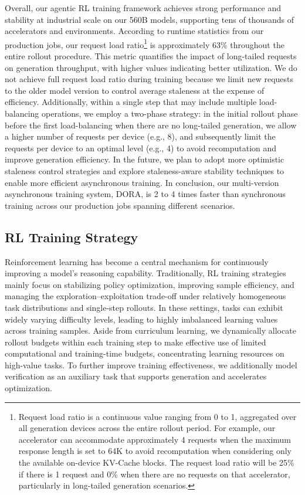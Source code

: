 \documentclass{article}
\begin{document}
Overall, our agentic RL training framework achieves strong performance and stability at industrial scale on our 560B models, supporting tens of thousands of accelerators and environments. According to runtime statistics from our production jobs, our request load ratio\footnote{Request load ratio is a continuous value ranging from 0 to 1, aggregated over all generation devices across the entire rollout period. For example, our accelerator can accommodate approximately 4 requests when the maximum response length is set to 64K to avoid recomputation when considering only the available on-device KV-Cache blocks. The request load ratio will be 25\% if there is 1 request and 0\% when there are no requests on that accelerator, particularly in long-tailed generation scenarios.} is approximately 63\% throughout the entire rollout procedure. This metric quantifies the impact of long-tailed requests on generation throughput, with higher values indicating better utilization. We do not achieve full request load ratio during training because we limit new requests to the older model version to control average staleness at the expense of efficiency. Additionally, within a single step that may include multiple load-balancing operations, we employ a two-phase strategy: in the initial rollout phase before the first load-balancing when there are no long-tailed generation, we allow a higher number of requests per device (e.g., 8), and subsequently limit the requests per device to an optimal level (e.g., 4) to avoid recomputation and improve generation efficiency. In the future, we plan to adopt more optimistic staleness control strategies and explore staleness-aware stability techniques to enable more efficient asynchronous training. In conclusion, our multi-version asynchronous training system, DORA, is 2 to 4 times faster than synchronous training across our production jobs spanning different scenarios.

\subsection{RL Training Strategy}
\label{sec:post_training_rl_scaling}

Reinforcement learning has become a central mechanism for continuously improving a model’s reasoning capability.
Traditionally, RL training strategies mainly focus on stabilizing policy optimization, improving sample efficiency, and managing the exploration--exploitation trade-off under relatively homogeneous task distributions and single-step rollouts.
In these settings, tasks can exhibit widely varying difficulty levels, leading to highly imbalanced learning values across training samples.
Aside from curriculum learning, we dynamically allocate rollout budgets within each training step to make effective use of limited computational and training-time budgets, concentrating learning resources on high-value tasks.
To further improve training effectiveness, we additionally model verification as an auxiliary task that supports generation and accelerates optimization.
\end{document}
